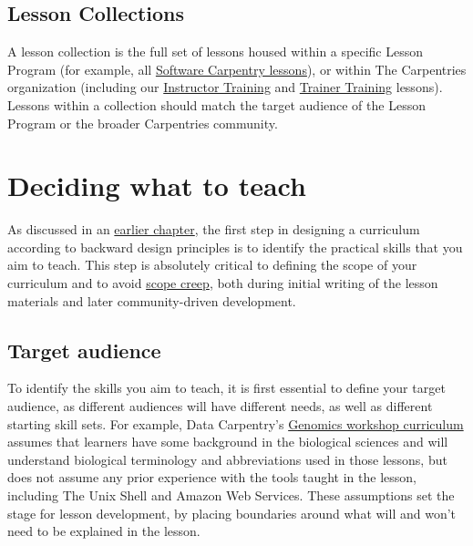 \documentclass[
]{book}
\begin{document}
\hypertarget{lesson-collections}{%
\section{Lesson Collections}\label{lesson-collections}}

A lesson collection is the full set of lessons housed within
a specific Lesson Program (for example, all \href{https://software-carpentry.org/lessons/}{Software Carpentry lessons}), or
within The Carpentries organization (including our \href{https://carpentries.github.io/instructor-training/}{Instructor Training} and
\href{https://carpentries.github.io/trainer-training/}{Trainer Training} lessons).
Lessons within a collection should match the target audience of the Lesson Program or
the broader Carpentries community.

\hypertarget{deciding-what-to-teach}{%
\chapter{Deciding what to teach}\label{deciding-what-to-teach}}

As discussed in an \href{https://carpentries.github.io/curriculum-development/conceptual-elements.html\#backward-design}{earlier chapter}, the first step in designing a curriculum according to backward design principles is to
identify the practical skills that you aim to teach. This step is absolutely critical to defining the scope of
your curriculum and to avoid \href{https://en.wikipedia.org/wiki/Scope_creep}{scope creep}, both during initial writing of the lesson materials and later
community-driven development.

\hypertarget{target-audience}{%
\section{Target audience}\label{target-audience}}

To identify the skills you aim to teach, it is first essential to define your
target audience, as different audiences will have different needs, as well as different starting skill sets. For
example, Data Carpentry's \href{https://datacarpentry.org/genomics-workshop/}{Genomics workshop curriculum} assumes
that learners have some background in the biological sciences and will understand biological terminology and
abbreviations used in those lessons, but does not assume any prior experience with the tools taught in the lesson,
including The Unix Shell and Amazon Web Services. These assumptions set the stage for lesson development, by
placing boundaries around what will and won't need to be explained in the lesson.
\end{document}

